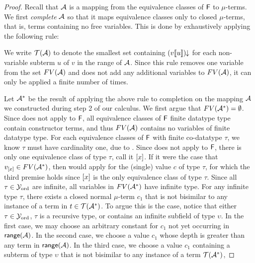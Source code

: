 \begin{proof}
Recall that $\mathcal{A}$ is a mapping from the equivalence classes of $\mathsf{F}$ to $\mu$-terms.
We first \emph{complete} $\mathcal{A}$ so that it maps equivalence classes only to closed $\mu$-terms, that is, terms containing no free variables.
This is done by exhaustively applying the following rule:



We write $\mathcal{T}(\mathcal{A})$ to denote the smallest set containing ${(v[\![ u ]\!])}\!\!\downarrow$ for each non-variable subterm $u$ of $v$ in the range of $\mathcal{A}$.
Since this rule removes one variable from the set $FV( \mathcal{A} )$ and does not add any additional variables to $FV( \mathcal{A} )$, 
it can only be applied a finite number of times.

Let $\mathcal{A}^\ast$ be the result of applying the above rule to completion on the mapping $\mathcal{A}$ we constructed during step 2 of our calculus.
We first argue that $FV( \mathcal{A}^\ast ) = \emptyset$.
Since  does not apply to $\mathsf{F}$,
all equivalence classes of $\mathsf{F}$ finite datatype type contain constructor terms, 
and thus $FV( \mathcal{A} )$ contains no variables of finite datatype type.
For each equivalence classes of $\mathsf{F}$ with finite co-datatype $\tau$, 
we know $\tau$ must have cardinality one, due to .
Since  does not apply to $\mathsf{F}$, 
there is only one equivalence class of type $\tau$, call it $[ x ]$.
If it were the case that $v_{[ x ]} \in FV(\mathcal{A}^\ast )$,
then  would apply for the (single) value $c$ of type $\tau$, 
for which the third premise holds since $[ x ]$ is the only equivalence class of type $\tau$.
Since all $\tau \in \mathcal{Y}_{\mathrm{ord}}$ are infinite, all variables in $FV( \mathcal{A}^\ast )$ have infinite type.
For any infinite type $\tau$,
there exists a closed normal $\mu$-term $c_1$ that is not bisimilar to any instance of a term in $t \in \mathcal{T}(\mathcal{A}^\ast)$.
To argue this is the case, notice that either $\tau \in \mathcal{Y}_{\mathrm{ord}}$,
$\tau$ is a recursive type, or contains an infinite subfield of type $\upsilon$.
In the first case, we may choose an arbitrary constant for $c_1$ not yet occurring in $\mathsf{range}(\mathcal{A})$.
In the second case, we choose a value $c_1$ whose depth is greater than any term in $\mathsf{range}(\mathcal{A})$.
In the third case, we choose a value $c_1$ containing a subterm of type $\upsilon$ that is not bisimilar to any instance of a term $\mathcal{T}(\mathcal{A}^\ast)$, 

\end{proof}
